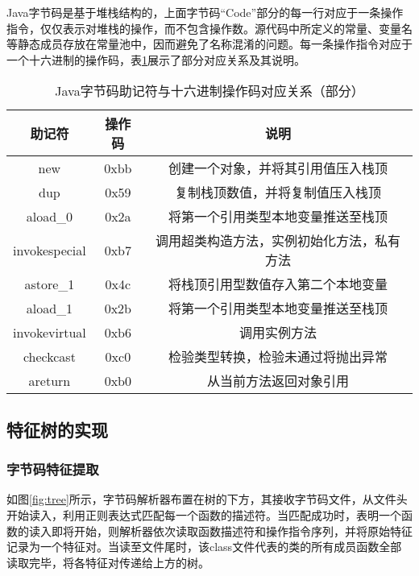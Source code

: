Java字节码是基于堆栈结构的，上面字节码“Code”部分的每一行对应于一条操作指令，仅仅表示对堆栈的操作，而不包含操作数。源代码中所定义的常量、变量名等静态成员存放在常量池中，因而避免了名称混淆的问题。每一条操作指令对应于一个十六进制的操作码，表\ref{tab:bytecode}展示了部分对应关系及其说明。


\begin{table}[!hpt]
  \caption{Java字节码助记符与十六进制操作码对应关系（部分）}
  \label{tab:bytecode}
  \centering
  \begin{tabular}{ccc} \toprule
    助记符 & 操作码 & 说明 \\ \midrule
    new  & 0xbb & 创建一个对象，并将其引用值压入栈顶 \\
	dup & 0x59 & 复制栈顶数值，并将复制值压入栈顶 \\
	aload\_0 & 0x2a & 将第一个引用类型本地变量推送至栈顶 \\
	invokespecial & 0xb7 & 调用超类构造方法，实例初始化方法，私有方法 \\
	astore\_1 & 0x4c & 将栈顶引用型数值存入第二个本地变量 \\
	aload\_1 & 0x2b & 将第一个引用类型本地变量推送至栈顶 \\
	invokevirtual & 0xb6 & 调用实例方法 \\
	checkcast & 0xc0 & 检验类型转换，检验未通过将抛出异常 \\
	areturn & 0xb0 & 从当前方法返回对象引用 \\ \bottomrule
  \end{tabular}
\end{table}




\subsection{特征树的实现}

\subsubsection{字节码特征提取}

如图\ref{fig:tree}所示，字节码解析器布置在树的下方，其接收字节码文件，从文件头开始读入，利用正则表达式匹配每一个函数的描述符。当匹配成功时，表明一个函数的读入即将开始，则解析器依次读取函数描述符和操作指令序列，并将原始特征记录为一个特征对。当读至文件尾时，该class文件代表的类的所有成员函数全部读取完毕，将各特征对传递给上方的树。


